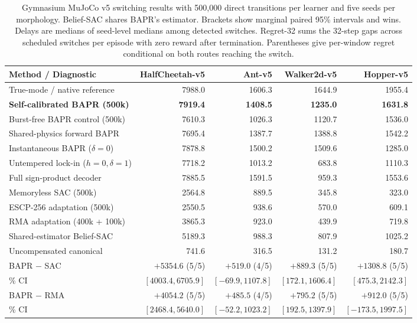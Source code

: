 \documentclass[twoside,11pt]{article}
\begin{document}
\begin{table}[t]
\centering
\footnotesize
\setlength{\tabcolsep}{2.6pt}
\caption{Gymnasium MuJoCo v5 switching results with 500,000 direct transitions per learner and five seeds per morphology. Belief-SAC shares BAPR's estimator. Brackets show marginal paired 95\% intervals and wins. Delays are medians of seed-level medians among detected switches. Regret-32 sums the 32-step gaps across scheduled switches per episode with zero reward after termination. Parentheses give per-window regret conditional on both routes reaching the switch.}
\label{tab:v51_mujoco}
\begin{tabular}{lrrrr}
\toprule
Method / Diagnostic & HalfCheetah-v5 & Ant-v5 & Walker2d-v5 & Hopper-v5 \\
\midrule
True-mode / native reference & 7988.0 & 1606.3 & 1644.9 & 1955.4 \\
\textbf{Self-calibrated BAPR (500k)} & \textbf{7919.4} & \textbf{1408.5} & \textbf{1235.0} & \textbf{1631.8} \\
Burst-free BAPR control (500k) & 7610.3 & 1026.3 & 1120.7 & 1536.0 \\
Shared-physics forward BAPR & 7695.4 & 1387.7 & 1388.8 & 1542.2 \\
Instantaneous BAPR ($\delta=0$) & 7878.8 & 1500.2 & 1509.6 & 1285.0 \\
Untempered lock-in ($h=0,\delta=1$) & 7718.2 & 1013.2 & 683.8 & 1110.3 \\
Full sign-product decoder & 7885.5 & 1591.5 & 959.3 & 1553.6 \\
Memoryless SAC (500k) & 2564.8 & 889.5 & 345.8 & 323.0 \\
ESCP-256 adaptation (500k) & 2550.5 & 938.6 & 570.0 & 609.1 \\
RMA adaptation (400k + 100k) & 3865.3 & 923.0 & 439.9 & 719.8 \\
Shared-estimator Belief-SAC & 5189.3 & 988.3 & 807.9 & 1025.2 \\
Uncompensated canonical & 741.6 & 316.5 & 131.2 & 180.7 \\
\midrule
BAPR $-$ SAC & $+5354.6$ (5/5) & $+519.0$ (4/5) & $+889.3$ (5/5) & $+1308.8$ (5/5) \\
\quad 95\% CI & $[4003.4,6705.9]$ & $[-69.9,1107.8]$ & $[172.1,1606.4]$ & $[475.3,2142.3]$ \\
BAPR $-$ RMA & $+4054.2$ (5/5) & $+485.5$ (4/5) & $+795.2$ (5/5) & $+912.0$ (5/5) \\
\quad 95\% CI & $[2468.4,5640.0]$ & $[-52.2,1023.2]$ & $[192.5,1397.9]$ & $[-173.5,1997.5]$ \\

\end{tabular}
\end{table}
\end{document}
